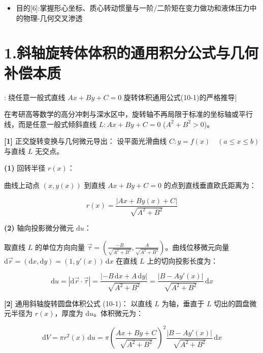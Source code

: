 \documentclass[11pt,a4paper,UTF8]{ctexart}
\begin{document}
\begin{targetbox}[本章复习目标与核心知识图谱]
\begin{itemize}
  \item 目的[6]:掌握形心坐标、质心转动惯量与一阶/二阶矩在变力做功和液体压力中的物理-几何交叉渗透
\end{itemize}
\end{targetbox}


\section{1.斜轴旋转体体积的通用积分公式与几何补偿本质}

\begin{thmbox}[模型[1]: 绕任意一般式直线 $Ax+By+C=0$ 旋转体积通用公式(10-1)的严格推导]

在考研高等数学的高分冲刺与深水区中，旋转轴不再局限于标准的坐标轴或平行线，而是任意一般式倾斜直线 $L: Ax + By + C = 0$ ($A^2+B^2 > 0$)。

\textbf{[1]} 正交旋转变换与几何微元导出：
设平面光滑曲线 $C: y = f(x) \quad (a \leqslant x \leqslant b)$ 与直线 $L$ 无交点。

\textbf{(1)}  \textit{}回转半径 $r(x)$\textit{}：

曲线上动点 $(x, y(x))$ 到直线 $Ax + By + C = 0$ 的点到直线垂直欧氏距离为：


\begin{equation*}
r(x) = \frac{|Ax + By(x) + C|}{\sqrt{A^2 + B^2}}
\end{equation*}


\textbf{(2)}  \textit{}轴向投影微分微元 $\mathrm{d}u$\textit{}：

取直线 $L$ 的单位方向向量 $\vec{\tau} = \left(\frac{-B}{\sqrt{A^2+B^2}}, \frac{A}{\sqrt{A^2+B^2}}\right)$。曲线位移微元向量 $\mathrm{d}\vec{r} = (\mathrm{d}x, \mathrm{d}y) = (1, y'(x))\,\mathrm{d}x$ 在直线 $L$ 上的切向投影长度为：


\begin{equation*}
\mathrm{d}u = |\mathrm{d}\vec{r} \cdot \vec{\tau}| = \frac{|-B\,\mathrm{d}x + A\,\mathrm{d}y|}{\sqrt{A^2+B^2}} = \frac{|B - A y'(x)|}{\sqrt{A^2+B^2}}\,\mathrm{d}x
\end{equation*}


\textbf{[2]} 通用斜轴旋转圆盘体积公式 (10-1)：
以直线 $L$ 为轴，垂直于 $L$ 切出的圆盘微元半径为 $r(x)$，厚度为 $\mathrm{d}u$。体积微元为：


\begin{equation*}
\mathrm{d}V = \pi r^2(x)\,\mathrm{d}u = \pi \left(\frac{Ax+By+C}{\sqrt{A^2+B^2}}\right)^2 \frac{|B - A y'(x)|}{\sqrt{A^2+B^2}}\,\mathrm{d}x
\end{equation*}



\end{thmbox}
\end{document}
